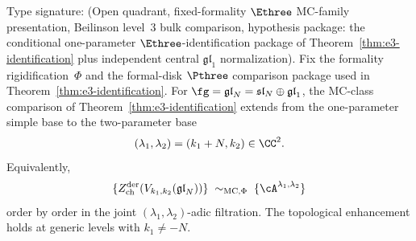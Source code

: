 \begin{proposition}
\label{prop:e3-glN-two-parameter}
\label{rem:e3-non-simple-gl-N}
\ClaimStatusConditional
Type signature: \textup{(}Open quadrant, fixed-formality
$\Ethree$ MC-family presentation, Beilinson level~$3$ bulk comparison,
hypothesis package: the conditional one-parameter
$\Ethree$-identification package of
Theorem~\textup{\ref{thm:e3-identification}} plus independent
central $\mathfrak{gl}_1$ normalization\textup{)}.
Fix the formality rigidification~$\Phi$ and the formal-disk
$\Pthree$ comparison package used in
Theorem~\ref{thm:e3-identification}. For
$\fg = \mathfrak{gl}_N = \mathfrak{sl}_N \oplus
\mathfrak{gl}_1$, the MC-class comparison of
Theorem~\ref{thm:e3-identification} extends from the one-parameter
simple base to the two-parameter base
\[
(\lambda_1,\lambda_2)=(k_1+N,k_2)\in \CC^2.
\]
Equivalently,
\[
 \{Z^{\mathrm{der}}_{\mathrm{ch}}
 (V_{k_1,k_2}(\mathfrak{gl}_N))\}
 \;\sim_{\mathrm{MC},\Phi}\;
 \{\cA^{\lambda_1,\lambda_2}\}
\]
order by order in the joint $(\lambda_1,\lambda_2)$-adic
filtration. The topological enhancement holds at generic levels
with $k_1\neq -N$.
\end{proposition}


